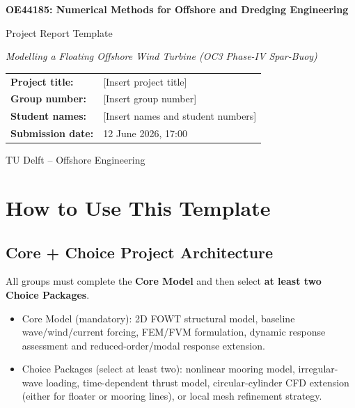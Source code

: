 \documentclass[11pt,a4paper]{article}
\begin{document}
\begin{titlepage}
    \centering
    \vspace*{2cm}
    {\huge\bfseries\sffamily OE44185: Numerical Methods for Offshore and Dredging Engineering\par}
    \vspace{0.75cm}
    {\Large\sffamily Project Report Template\par}
    \vspace{1.25cm}
    {\large\itshape Modelling a Floating Offshore Wind Turbine (OC3 Phase-IV Spar-Buoy)\par}
    \vspace{2cm}
    \begin{tabular}{ll}
        \textbf{Project title:} & [Insert project title] \\
        \textbf{Group number:} & [Insert group number] \\
        \textbf{Student names:} & [Insert names and student numbers] \\
        \textbf{Submission date:} & 12 June 2026, 17:00 \\
    \end{tabular}
    \vfill
    {\large\sffamily TU Delft -- Offshore Engineering\par}
\end{titlepage}


\section*{How to Use This Template}


\subsection*{Core + Choice Project Architecture}
All groups must complete the \textbf{Core Model} and then select \textbf{at least two Choice Packages}.
\begin{itemize}
    \item Core Model (mandatory): 2D FOWT structural model, baseline wave/wind/current forcing, FEM/FVM formulation, dynamic response assessment and reduced-order/modal response extension.
    \item Choice Packages (select at least two): nonlinear mooring model, irregular-wave loading, time-dependent thrust model, circular-cylinder CFD extension (either for floater or mooring lines), or local mesh refinement strategy.
\end{itemize}
\end{document}
